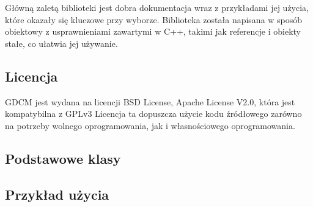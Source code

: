 \par
Główną zaletą biblioteki jest dobra dokumentacja wraz z przykładami jej użycia, które okazały się kluczowe przy wyborze.
Biblioteka została napisana w sposób obiektowy z usprawnieniami zawartymi w C++, takimi jak referencje i obiekty stałe, co ułatwia jej używanie.

\subsection{Licencja}

\par 
GDCM jest wydana na licencji BSD License, Apache License V2.0, która jest kompatybilna z GPLv3
Licencja ta dopuszcza użycie kodu źródłowego zarówno na potrzeby wolnego oprogramowania, jak i własnościowego oprogramowania.


\subsection{Podstawowe klasy}
\label{sec:gdcm-classes}


\subsection{Przykład użycia}
\label{sec:gdcm-use}
